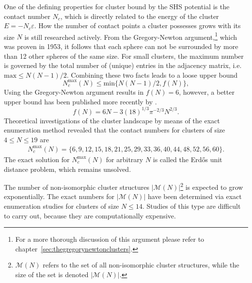 One of the defining properties for cluster bound by the \ac{SHS} potential is
the contact number $N_c$, which is directly related to the energy of the cluster
$E=-N_c\varepsilon$. How the number of contact points a cluster possesses grows
with its size $N$ is still researched actively. From the Gregory-Newton
argument,\footnote{For a more thorough discussion of this argument please refer
to chapter~\ref{sec:thegregorynewtonclusters}.} which was proven in 1953, it
follows that each sphere can not be surrounded by more than 12 other spheres of
the same size. For small clusters, the maximum number is governed by the total
number of (unique) entries in the adjacency matrix, i.e. $\text{max}\leq
N(N-1)/2$. Combining these two facts leads to a loose upper bound
%
\begin{equation}
    N_c^\mathrm{max}(N) \le \text{min}\{N(N-1)/2,f(N)\},
    \label{eqn:upperlimitNc}
\end{equation}
%
Using the Gregory-Newton argument results in $f(N)=6$, however, a better upper
bound has been published more recently by
\citeauthor{Bezdek-2013}\autocite{Bezdek-2013}.
%
\begin{equation}
    f(N)=6N-3(18)^{1/3}\pi^{-2/3}N^{2/3}.
    \label{eqn:upperlimitBR}
\end{equation}
%
Theoretical investigations of the cluster landscape by means of the exact
enumeration method revealed that the contact numbers for clusters of size $4
\leq N \leq 19$ are\autocite{Hoy_Structuredynamicsmodel_2015,Holmes-Cerfon_EnumeratingRigidSphere_2016}
%
\begin{align}
    N_c^\mathrm{max}(N) =\{6,9,12,15,18,21,25,29,33,36,40,44,48,52,56,60\}.
\end{align}
%
The exact solution for $N_c^\mathrm{max}(N)$ for arbitrary $N$ is called the
Erd\H{o}s unit distance problem, which remains unsolved.\autocite{Erdos-1946}

The number of non-isomorphic cluster structures
$|\mathcal{M}(N)|$\footnote{$\mathcal{M}(N)$ refers to the set of all
non-isomorphic cluster structures, while the size of the set is denoted
$|\mathcal{M}(N)|$.} is expected to grow
exponentially.\autocite{Stillinger_Exponentialmultiplicityinherent_1999,Oganov-2006,Forman_ModelingAggregationProcesses_2017}
The exact numbers for $|\mathcal{M}(N)|$ have been determined via exact
enumeration studies for clusters of size $N \leq
14$.\autocite{Hoy_Structuredynamicsmodel_2015,Holmes-Cerfon_EnumeratingRigidSphere_2016}
Studies of this type are difficult to carry out, because they are
computationally expensive.\autocite{Heiles_Globaloptimizationclusters_2013}

